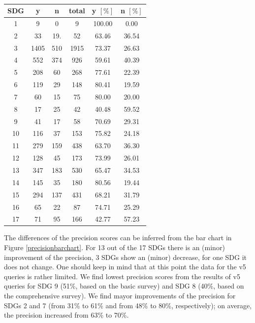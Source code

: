 \documentclass{article}
\begin{document}
\begin{table}[H]
\centering 
 \begin{tabular}{cccccc}
 \toprule
 SDG & y & n & total & y $[\%]$ & n $[\%]$ \\
 \hline
  1 & 9 & 0 & 9 & 100.00 & 0.00 \\
 2 & 33 & 19. & 52 & 63.46 & 36.54 \\
 3 & 1405 & 510 & 1915 & 73.37 & 26.63 \\
 4 & 552 & 374 & 926 & 59.61 & 40.39 \\
 5 & 208 & 60 & 268 & 77.61 & 22.39 \\
 6 & 119 & 29 & 148 & 80.41 & 19.59 \\
 7 & 60 & 15 & 75 & 80.00 & 20.00 \\
 8 & 17 & 25 & 42 & 40.48 & 59.52 \\
 9 & 41 & 17 & 58 & 70.69 & 29.31 \\
 10 & 116 & 37 & 153 & 75.82 & 24.18 \\
 11 & 279 & 159 & 438 & 63.70 & 36.30 \\
 12 & 128 & 45 & 173 & 73.99 & 26.01 \\
 13 & 347 & 183 & 530 & 65.47 & 34.53 \\
 14 & 145 & 35 & 180 & 80.56 & 19.44 \\
 15 & 294 & 137 & 431 & 68.21 & 31.79 \\
 16 & 65 & 22 & 87 & 74.71 & 25.29 \\
 17 & 71 & 95 & 166 & 42.77 & 57.23 \\
 \bottomrule
\end{tabular}
\caption{}
\label{precisionv5survold}
\end{table}
The differences of the precision scores can be inferred from the bar chart in Figure \ref{precisionbarchart}. For 13 out of the 17 SDGs there is an (minor) improvement of the precision, 3 SDGs show an (minor) decrease, for one SDG it does not change. One should keep in mind that at this point the data for the v5 queries is rather limited.
We find lowest precision scores from the results of v5 queries for SDG 9 (51\%, based on the basic survey) and SDG 8 (40\%, based on the comprehensive survey). We find mayor improvements of the precision for SDGs 2 and 7 (from 31\% to 61\% and from 48\% to 80\%, respectively); on average, the precision increased from 63\% to 70\%.
\end{document}
